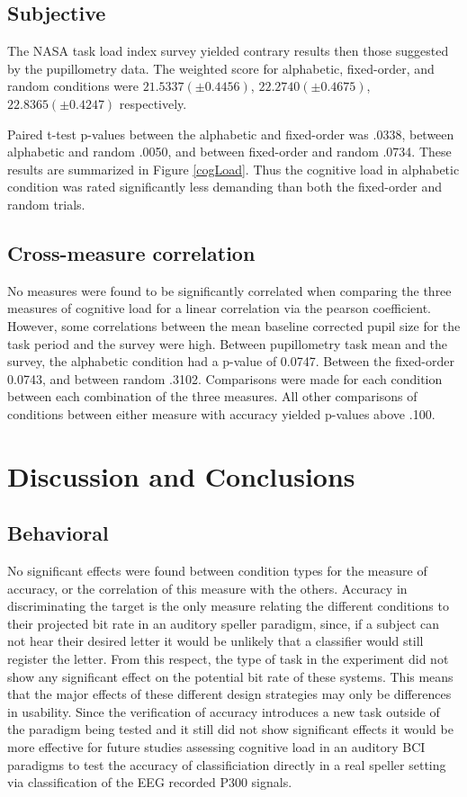 \documentclass[10pt]{article}
\begin{document}
\subsection{Subjective}

The NASA task load index survey yielded contrary results then
those suggested by the pupillometry data.  
The weighted score for alphabetic, fixed-order, and random
conditions were 
$21.5337 (\pm 0.4456)$, $22.2740 (\pm 0.4675)$, $22.8365 (\pm
0.4247)$ respectively.

Paired t-test p-values between the alphabetic and fixed-order was
.0338, between alphabetic and random .0050, and between fixed-order
and random .0734.  These results are summarized in Figure
\ref{cogLoad}.  Thus the cognitive load in alphabetic condition was
rated significantly less demanding than both the fixed-order and
random trials.

\subsection{Cross-measure correlation}
No measures were found to
be significantly correlated when comparing the three measures of cognitive load for a linear correlation via the pearson coefficient. However, some correlations between the
mean baseline corrected pupil size for the task period and the survey were high.
Between pupillometry task mean and the survey, the alphabetic condition had a p-value
of 0.0747.  Between the fixed-order 0.0743, and between random
.3102.
Comparisons were made for each condition
between each combination of the three measures.  All other
comparisons of conditions between either measure with accuracy yielded
p-values above .100.

\section{Discussion and Conclusions}

\subsection{Behavioral}

No significant effects were found between condition types for
the measure of accuracy, or the correlation of this measure
with the others.  Accuracy in discriminating the target is the
only measure relating the different conditions to their
projected bit rate in an auditory speller paradigm, since, if
a subject can not hear their desired letter it would be
unlikely that a classifier would still register the letter.
From this respect, the type of task in the experiment did not
show any significant effect on the potential bit rate of these
systems. This means that the major effects of these different
design strategies may only be differences in usability. Since
the verification of accuracy introduces a new task outside of
the paradigm being tested and it still did not show
significant effects it would be more effective for future
studies assessing cognitive load in an auditory BCI paradigms
to test the accuracy of classificiation directly in a real
speller setting via classification of the EEG recorded P300
signals.
\end{document}
